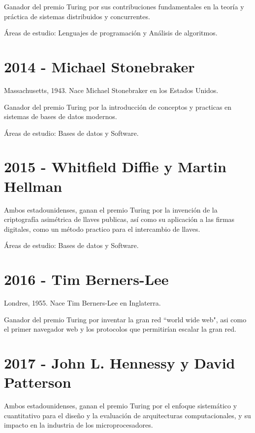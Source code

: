 \documentclass[notitlepage,letterpaper, 11pt]{article}
\begin{document}
\noindent Ganador del premio Turing por sus contribuciones fundamentales en la teoría y práctica de sistemas distribuidos y concurrentes.

\noindent Áreas de estudio: Lenguajes de programación y Análisis de algoritmos.
\newline

\section*{2014 - Michael Stonebraker}
\noindent Massachusetts, 1943. Nace Michael Stonebraker en los Estados Unidos.

\noindent Ganador del premio Turing por la introducción de conceptos y practicas en sistemas de bases de datos modernos.

\noindent Áreas de estudio: Bases de datos y Software.
\newline

\section*{2015 - Whitfield Diffie y Martin Hellman}
\noindent Ambos estadounidenses, ganan el premio Turing por la invención de la criptografía asimétrica de llaves publicas, así como su aplicación a las firmas digitales, como un método practico para el intercambio de llaves.

\noindent Áreas de estudio: Bases de datos y Software.
\newline

\section*{2016 - Tim Berners-Lee}
\noindent Londres, 1955. Nace Tim Berners-Lee en Inglaterra.

\noindent Ganador del premio Turing por inventar la gran red ``world wide web", asi como el primer navegador web y los protocolos que permitirían escalar la gran red.
\newline

\section*{2017 - John L. Hennessy y David Patterson}
\noindent Ambos estadounidenses, ganan el premio Turing por el enfoque sistemático y cuantitativo para el diseño y la evaluación de arquitecturas computacionales, y su impacto en la industria de los microprocesadores.
\newline
\end{document}
